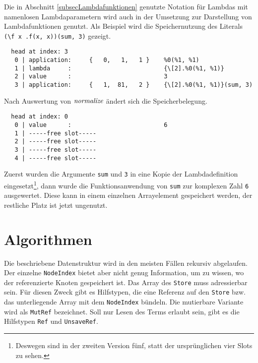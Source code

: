 \begin{beispiel} \label{bspREPLlambda}
Die in Abschnitt \ref{subsecLambdafunktionen} genutzte Notation für Lambdas mit namenlosen Lambdaparametern wird auch in der Umsetzung zur Darstellung von Lambdafunktionen genutzt. Als Beispiel wird die Speichernutzung des Literals \verb|(\f x .f(x, x))(sum, 3)| gezeigt.
\begin{unbreakable}\begin{verbatim}
  head at index: 3
   0 | application:     {   0,   1,   1 }    %0(%1, %1)
   1 | lambda     :                          {\[2].%0(%1, %1)}
   2 | value      :                          3
   3 | application:     {   1,  81,   2 }    {\[2].%0(%1, %1)}(sum, 3)
\end{verbatim}\end{unbreakable}
Nach Auswertung von $\mathit{normalize}$ ändert sich die Speicherbelegung.
\begin{unbreakable}\begin{verbatim}
  head at index: 0
   0 | value      :                          6
   1 | -----free slot-----
   2 | -----free slot-----
   3 | -----free slot-----
   4 | -----free slot-----
\end{verbatim}\end{unbreakable}
Zuerst wurden die Argumente \verb|sum| und \verb|3| in eine Kopie der Lambdadefinition eingesetzt\footnote{Deswegen sind in der zweiten Version fünf, statt der ursprünglichen vier Slots zu sehen.}, dann wurde die Funktionsanwendung von \verb|sum| zur komplexen Zahl \verb|6| ausgewertet. Diese kann in einem einzelnen Arrayelement gespeichert werden, der restliche Platz ist jetzt ungenutzt.
\end{beispiel}





\section{Algorithmen} \label{subsecCppAlgos}

Die beschriebene Datenstruktur wird in den meisten Fällen rekursiv abgelaufen. Der einzelne \verb|NodeIndex| bietet aber nicht genug Information, um zu wissen, wo der referenzierte Knoten gespeichert ist. Das Array des \verb|Store| muss adressierbar sein. Für diesen Zweck gibt es Hilfstypen, die eine Referenz auf den \verb|Store| bzw. das unterliegende Array mit dem \verb|NodeIndex| bündeln. Die mutierbare Variante wird als \verb|MutRef| bezeichnet. Soll nur Lesen des Terms erlaubt sein, gibt es die Hilfstypen \verb|Ref| und \verb|UnsaveRef|. 

